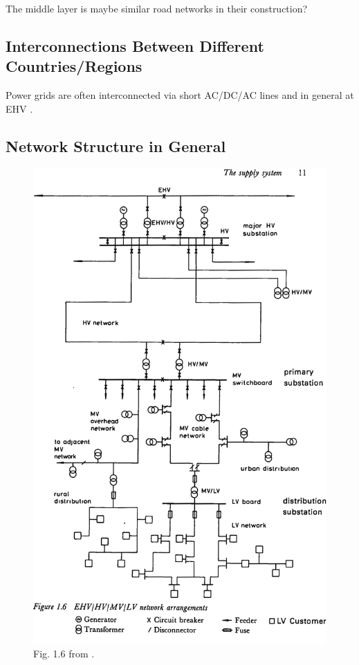 \documentclass[paper=a4, fontsize=12pt]{article}
\begin{document}
The middle layer is maybe similar road networks \cite{Strano2012} in their construction?

\subsection*{Interconnections Between Different Countries/Regions}

Power grids are often interconnected via short AC/DC/AC lines and in general at EHV \cite[p.6]{Lakervi1995}.

\subsection*{Network Structure in General}

\begin{figure}
\centering
\includegraphics[height=\textheight]{lakervi-fig1p6.png}
\caption{Fig. 1.6 from \cite{Lakervi1995}.}
\end{figure}
\end{document}
